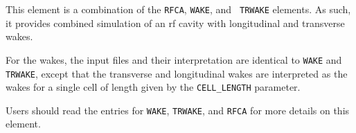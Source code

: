 This element is a combination of the {\tt RFCA}, {\tt WAKE}, and {\tt
TRWAKE} elements.  As such, it provides combined simulation of an rf
cavity with longitudinal and transverse wakes.

For the wakes, the input files and their interpretation are identical
to {\tt WAKE} and {\tt TRWAKE}, except that the transverse and
longitudinal wakes are interpreted as the wakes for a single cell of
length given by the {\tt CELL\_LENGTH} parameter.

Users should read the entries for {\tt WAKE}, {\tt TRWAKE}, and {\tt RFCA}
for more details on this element.



